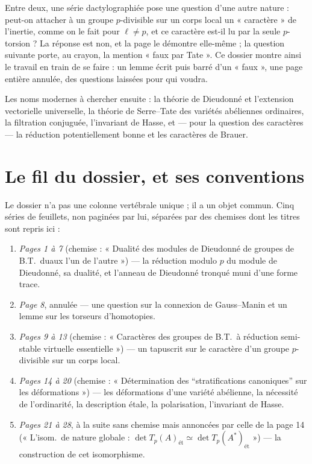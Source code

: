 \documentclass[11pt,a4paper]{article}
\begin{document}
\begin{resume}
Entre deux, une série dactylographiée pose une question d'une autre nature :
peut-on attacher à un groupe $p$-divisible sur un corps local un
« caractère » de l'inertie, comme on le fait pour $\ell \neq p$, et ce
caractère est-il lu par la seule $p$-torsion ? La réponse est non, et la
page le démontre elle-même ; la question suivante porte, au crayon, la mention
« faux par Tate ». Ce dossier montre ainsi le travail en train de se faire :
un lemme écrit puis barré d'un « faux », une page entière annulée, des
questions laissées pour qui voudra.

Les noms modernes à chercher ensuite : la théorie de Dieudonné et l'extension
vectorielle universelle, la théorie de Serre--Tate des variétés abéliennes
ordinaires, la filtration conjuguée, l'invariant de Hasse, et --- pour la
question des caractères --- la réduction potentiellement bonne et les
caractères de Brauer.

\end{resume}

\section*{Le fil du dossier, et ses conventions}

Le dossier n'a pas une colonne vertébrale unique ; il a un objet commun. Cinq
séries de feuillets, non paginées par lui, séparées par des chemises dont
les titres sont repris ici :

\begin{enumerate}
\item \emph{Pages 1 à 7} (chemise : « Dualité des modules de Dieudonné de
groupes de B.T.\ duaux l'un de l'autre ») --- la réduction modulo $p$ du
module de Dieudonné, sa dualité, et l'anneau de Dieudonné tronqué muni d'une
forme trace.
\item \emph{Page 8}, annulée --- une question sur la connexion de
Gauss--Manin et un lemme sur les torseurs d'homotopies.
\item \emph{Pages 9 à 13} (chemise : « Caractères des groupes de B.T.\ à
réduction semi-stable virtuelle essentielle ») --- un tapuscrit sur le
caractère d'un groupe $p$-divisible sur un corps local.
\item \emph{Pages 14 à 20} (chemise : « Détermination des
“stratifications canoniques” sur les déformations ») --- les déformations
d'une variété abélienne, la nécessité de l'ordinarité, la description étale,
la polarisation, l'invariant de Hasse.
\item \emph{Pages 21 à 28}, à la suite sans chemise mais annoncées par celle
de la page 14 (« L'isom.\ de nature globale : $\det T_p(A)_{\text{ét}} \simeq
\det T_p(A^*)_{\text{ét}}$ ») --- la construction de cet isomorphisme.
\end{enumerate}
\end{document}
